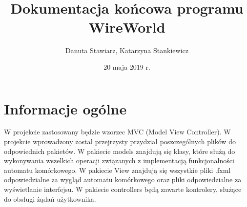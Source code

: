 \documentclass[10pt, oneside]{article}
\title{Dokumentacja końcowa programu WireWorld}
\author{Danuta Stawiarz, Katarzyna Stankiewicz}
\date{20 maja 2019 r.}
\begin{document}
\maketitle
\tableofcontents
\newpage	


\section {Informacje ogólne}

W projekcie zastosowany będzie wzorzec MVC (Model View Controller). W projekcie wprowadzony został przejrzysty przydział poszczególnych plików do odpowiednich pakietów. 
W pakiecie models znajdują się  klasy, które służą do wykonywania wszelkich operacji związanych z implementacją funkcjonalności automatu komórkowego.
W pakiecie View znajdują się wszystkie pliki .fxml odpowiedzialne za wygląd automatu komórkowego oraz pliki odpowiedzialne za wyświetlanie interfejsu.
W pakiecie controllers będą zawarte kontrolery, służące do obsługi żądań użytkownika.
\end{document}
